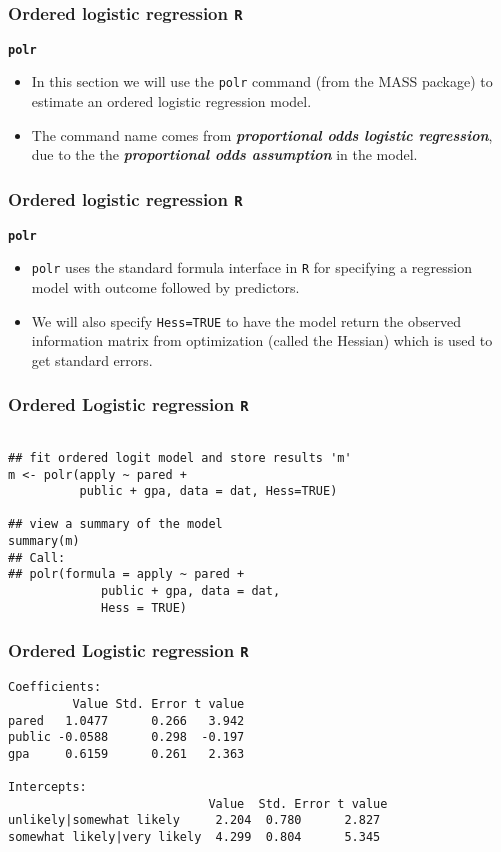 \documentclass[00-GLMregslides.tex]{subfiles}
\begin{document}
\begin{frame}[fragile]
	\frametitle{Ordered logistic regression \texttt{R} }
	\Large
\textbf{\texttt{polr}}
\begin{itemize}
\item In this section we will use the \texttt{polr} command (from the MASS package) to estimate an ordered logistic 
regression model. 
\item The command name comes from \textbf{\textit{proportional odds logistic regression}}, due to the the \textbf{\textit{proportional odds assumption}} in the model. 
\end{itemize}
\end{frame}
\begin{frame}[fragile]
	\frametitle{Ordered logistic regression \texttt{R} }
	\Large
\textbf{\texttt{polr}}
\begin{itemize}
\item \texttt{polr} uses the standard formula interface in \texttt{R} for specifying a regression model with outcome 
followed by predictors. 
\item We will also specify \texttt{Hess=TRUE} to have the model return the observed information matrix from optimization (called the Hessian) which is used to get standard errors.
\end{itemize}
\end{frame}
\begin{frame}[fragile]
\frametitle{Ordered Logistic regression \texttt{R} }
\large
\begin{framed}		
\begin{verbatim}
	
## fit ordered logit model and store results 'm'
m <- polr(apply ~ pared + 
          public + gpa, data = dat, Hess=TRUE)

## view a summary of the model
summary(m)
## Call:
## polr(formula = apply ~ pared + 
             public + gpa, data = dat, 
             Hess = TRUE)
\end{verbatim}
\end{framed}
\end{frame}
\begin{frame}[fragile]
	\frametitle{Ordered Logistic regression \texttt{R} }
	\normalsize
\begin{verbatim}
Coefficients:
         Value Std. Error t value
pared   1.0477      0.266   3.942
public -0.0588      0.298  -0.197
gpa     0.6159      0.261   2.363

Intercepts:
                            Value  Std. Error t value
unlikely|somewhat likely     2.204  0.780      2.827 
somewhat likely|very likely  4.299  0.804      5.345 

\end{verbatim}

\end{frame}
\end{document}
